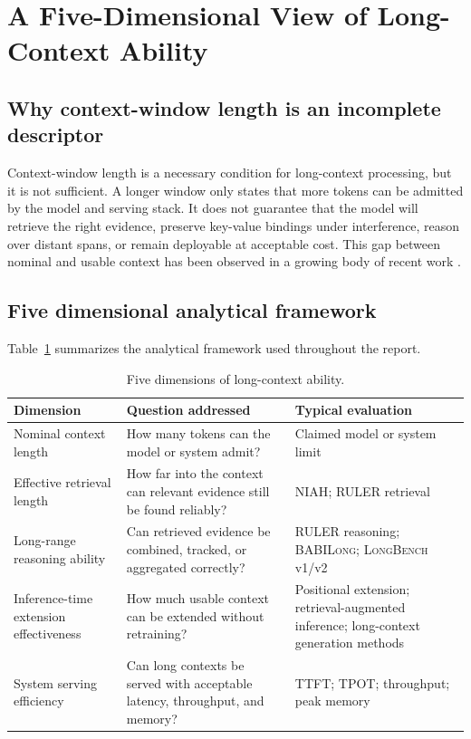 \documentclass[11pt]{article}
\begin{document}
\section{A Five-Dimensional View of Long-Context Ability}
\label{sec:framework}

\subsection{Why context-window length is an incomplete descriptor}
Context-window length is a necessary condition for long-context processing, but it is not sufficient. A longer window only states that more tokens can be admitted by the model and serving stack. It does not guarantee that the model will retrieve the right evidence, preserve key-value bindings under interference, reason over distant spans, or remain deployable at acceptable cost. This gap between nominal and usable context has been observed in a growing body of recent work \citep{liu2024lost, hsieh2024ruler, bai2025longbenchv2}.

\subsection{Five dimensional analytical framework}
Table~\ref{tab:framework} summarizes the analytical framework used throughout the report.

\begin{table}[t]
\centering
\caption{Five dimensions of long-context ability.}
\label{tab:framework}
\setlength{\tabcolsep}{6pt}
\renewcommand{\arraystretch}{1.18}
\begin{tabularx}{\textwidth}{
    >{\raggedright\arraybackslash}p{}
    >{\raggedright\arraybackslash}X
    >{\raggedright\arraybackslash}p{}
}
\toprule
\textbf{Dimension} 
& \textbf{Question addressed} 
& \textbf{Typical evaluation} \\
\midrule
Nominal context length
& How many tokens can the model or system admit?
& Claimed model or system limit \\

Effective retrieval length
& How far into the context can relevant evidence still be found reliably?
& \textsc{NIAH}; \textsc{RULER} retrieval \\

Long-range reasoning ability
& Can retrieved evidence be combined, tracked, or aggregated correctly?
& \textsc{RULER} reasoning; \textsc{BABILong}; \textsc{LongBench} v1/v2 \\

Inference-time extension effectiveness
& How much usable context can be extended without retraining?
& Positional extension; retrieval-augmented inference; long-context generation methods \\

System serving efficiency
& Can long contexts be served with acceptable latency, throughput, and memory?
& TTFT; TPOT; throughput; peak memory \\
\bottomrule
\end{tabularx}
\end{table}
\end{document}
